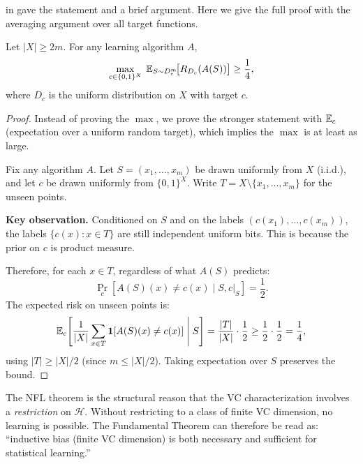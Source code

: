  in  gave the statement and a brief argument.
Here we give the full proof with the averaging argument over all target
functions.

\begin{thm}
\label{thm:nfl-full}
Let $|X| \geq 2m$.  For any learning algorithm $A$,
\[
  \max_{c \in \{0,1\}^X}\;
  \mathbb{E}_{S \sim D_c^m}\!\bigl[R_{D_c}(A(S))\bigr] \geq \frac{1}{4},
\]
where $D_c$ is the uniform distribution on $X$ with target $c$.
\end{thm}

\begin{proof}
Instead of proving the $\max$, we prove the stronger statement with $\mathbb{E}_c$
(expectation over a uniform random target), which implies the $\max$ is at
least as large.

Fix any algorithm $A$.  Let $S = (x_1, \ldots, x_m)$ be drawn uniformly from
$X$ (i.i.d.), and let $c$ be drawn uniformly from $\{0,1\}^X$.  Write
$T = X \setminus \{x_1, \ldots, x_m\}$ for the unseen points.

\medskip
\noindent\textbf{Key observation.}  Conditioned on $S$ and on the labels
$(c(x_1), \ldots, c(x_m))$, the labels $\{c(x) : x \in T\}$ are still
independent uniform bits.  This is because the prior on $c$ is product
measure.

Therefore, for each $x \in T$, regardless of what $A(S)$ predicts:
\[
  \Pr_{c}[A(S)(x) \neq c(x) \mid S, c|_S] = \frac{1}{2}.
\]
The expected risk on unseen points is:
\[
  \mathbb{E}_c\!\left[\frac{1}{|X|}\sum_{x \in T} \mathbf{1}[A(S)(x) \neq c(x)]
  \;\middle|\; S\right]
  = \frac{|T|}{|X|} \cdot \frac{1}{2}
  \geq \frac{1}{2} \cdot \frac{1}{2} = \frac{1}{4},
\]
using $|T| \geq |X|/2$ (since $m \leq |X|/2$).  Taking expectation over $S$
preserves the bound.
\end{proof}

\begin{remark}
\label{rmk:nfl-revisited}
The NFL theorem is the structural reason that the VC characterization involves
a \emph{restriction} on $\mathcal{H}$.  Without restricting to a class of
finite VC dimension, no learning is possible.  The Fundamental Theorem can
therefore be read as: ``inductive bias (finite VC dimension) is both necessary
and sufficient for statistical learning.''
\end{remark}



